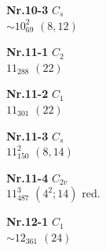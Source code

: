 \documentclass[12pt]{article}
\begin{document}
{\begin{minipage}[t]{3.5cm}
{{\bf Nr.10-3} \quad $C_{s}$\\ $\sim 10^2_{69}$ \quad $(8,12)$\\\vspace{3mm} }
\end{minipage}
\setlength{\unitlength}{1cm}
\begin{minipage}[t]{3.5cm}
\centering
\epsfxsize=2.5cm
\par
{{\bf Nr.11-1} \quad $C_2$\\ $11_{288}$ \quad $(22)$\\\vspace{3mm} }
\end{minipage}
\setlength{\unitlength}{1cm}
\begin{minipage}[t]{3.5cm}
\centering
\epsfxsize=2.5cm
\par
{{\bf Nr.11-2} \quad $C_{1}$\\ $11_{301}$ \quad $(22)$\\\vspace{3mm} }
\end{minipage}
\setlength{\unitlength}{1cm}
\begin{minipage}[t]{3.5cm}
\centering
\epsfxsize=2.5cm
\par
{{\bf Nr.11-3} \quad $C_{s}$\\ $11^2_{150}$ \quad $(8,14)$\\\vspace{3mm} }
\end{minipage}
\setlength{\unitlength}{1cm}
\begin{minipage}[t]{3.5cm}
\centering
\epsfxsize=2.5cm
\par
{{\bf Nr.11-4} \quad $C_{2v}$\\ $11^3_{487}$ \quad $(4^2;14)$ red.\\\vspace{3mm} }
\end{minipage}
\setlength{\unitlength}{1cm}
\begin{minipage}[t]{3.5cm}
\centering
\epsfxsize=2.5cm
\par
{{\bf Nr.12-1} \quad $C_{1}$\\ $\sim 12_{361}$ \quad $(24)$\\\vspace{3mm} }
\end{minipage}
\setlength{\unitlength}{1cm}
\begin{minipage}[t]{3.5cm}
\centering

\end{minipage}}
\end{document}
